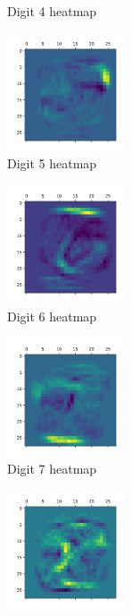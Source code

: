 \documentclass[a4paper]{article}    %
\begin{document}
\begin{figure}[H]
\begin{subfigure}{0.24\textwidth}
        \caption{Digit 4 heatmap}
        \label{fig:digit_4}
    \end{subfigure}
    \hfill
    \begin{subfigure}{0.24\textwidth}
        \centering
        \includegraphics[width=3.5cm]{digit_5}
        \caption{Digit 5 heatmap}
        \label{fig:digit_5}
    \end{subfigure}
    \hfill
    \begin{subfigure}{0.24\textwidth}
        \centering
        \includegraphics[width=3.5cm]{digit_6}
        \caption{Digit 6 heatmap}
        \label{fig:digit_6}
    \end{subfigure}
    \hfill
    \begin{subfigure}{0.24\textwidth}
        \centering
        \includegraphics[width=3.5cm]{digit_7}
        \caption{Digit 7 heatmap}
        \label{fig:digit_7}
    \end{subfigure}
    \hfill
    \begin{subfigure}{0.24\textwidth}
        \centering
        \includegraphics[width=3.5cm]{digit_8}

\end{subfigure}
\end{figure}
\end{document}
